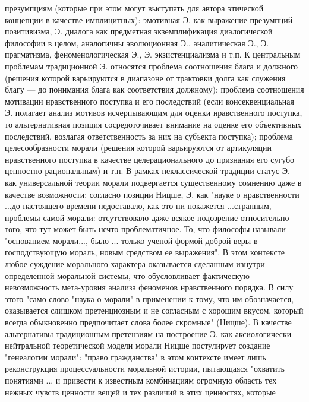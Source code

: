 \documentclass[12pt]{article}
\begin{document}
презумпциям (которые при этом могут выступать для автора этической концепции в качестве имплицитных):
эмотивная  Э.  как  выражение  презумпций  позитивизма,  Э.  диалога  как  предметная  экземплификация
диалогической  философии  в  целом,  аналогичны  эволюционная  Э.,  аналитическая  Э.,  Э.  прагматизма,
феноменологическая Э., Э. экзистенциализма и т.п. К центральным проблемам традиционной Э. относятся
проблема соотношения блага и должного (решения которой варьируются в диапазоне от трактовки долга как
служения  благу  —  до  понимания  блага  как  соответствия  должному);  проблема  соотношения  мотивации
нравственного  поступка  и  его  последствий  (если  консеквенциальная  Э.  полагает  анализ  мотивов
исчерпывающим для оценки нравственного поступка, то альтернативная позиция сосредоточивает внимание на
оценке  его  объективных  последствий,  возлагая  ответственность  за  них  на  субъекта  поступка);  проблема
целесообразности морали (решения которой варьируются от артикуляции нравственного поступка в качестве
целерационального  до  признания  его  сугубо  ценностно-рациональным)  и  т.п.  В  рамках  неклассической
традиции статус Э. как универсальной теории морали подвергается существенному сомнению даже в качестве
возможности: согласно позиции Ницше, Э. как "науке о нравственности ...до настоящего времени недоставало,
как  это  ни  покажется  ...странным,  проблемы  самой  морали:  отсутствовало  даже  всякое  подозрение
относительно  того,  что  тут  может  быть  нечто  проблематичное.  То,  что  философы  называли  "основанием
морали...,  было  ...  только  ученой  формой  доброй  веры  в  господствующую  мораль,  новым  средством  ее
выражения".  В  этом  контексте  любое  суждение  морального  характера  оказывается  сделанным  изнутри
определенной  моральной  системы,  что  обусловливает  фактическую  невозможность  мета-уровня  анализа
феноменов нравственного порядка. В силу этого "само слово "наука о морали" в применении к тому, что им
обозначается,  оказывается  слишком  претенциозным  и  не  согласным  с  хорошим  вкусом,  который  всегда
обыкновенно  предпочитает  слова  более  скромные"  (Ницше).  В  качестве  альтернативы  традиционным
претензиям  на  построение  Э.  как  аксиологически  нейтральной  теоретической  модели  морали  Ницше
постулирует создание "генеалогии морали": "право гражданства" в этом контексте имеет лишь реконструкция
процессуальности  моральной  истории,  пытающаяся  "охватить  понятиями  ...  и  привести  к  известным
комбинациям огромную область тех нежных чувств ценности вещей и тех различий в этих ценностях, которые
\end{document}
